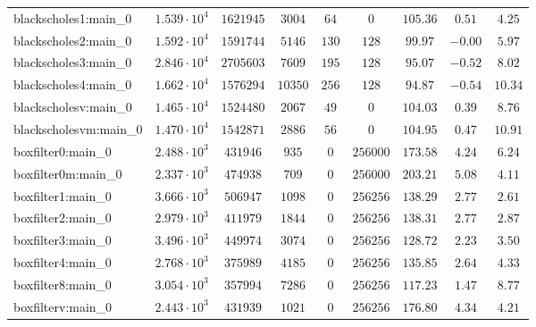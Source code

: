 \begin{tabular}{|l|c|c|c|c|c|c|c|c|}
blackscholes1:main\_0          & $ 1.539 \cdot 10^{4} $ & $ 1621945  $ & $ 3004   $ & $ 64   $ & $ 0        $ & $ 105.36      $ & $ 0.51    $ & $ 4.25    $ \\
blackscholes2:main\_0          & $ 1.592 \cdot 10^{4} $ & $ 1591744  $ & $ 5146   $ & $ 130  $ & $ 128      $ & $ 99.97       $ & $ -0.00   $ & $ 5.97    $ \\
blackscholes3:main\_0          & $ 2.846 \cdot 10^{4} $ & $ 2705603  $ & $ 7609   $ & $ 195  $ & $ 128      $ & $ 95.07       $ & $ -0.52   $ & $ 8.02    $ \\
blackscholes4:main\_0          & $ 1.662 \cdot 10^{4} $ & $ 1576294  $ & $ 10350  $ & $ 256  $ & $ 128      $ & $ 94.87       $ & $ -0.54   $ & $ 10.34   $ \\
blackscholesv:main\_0          & $ 1.465 \cdot 10^{4} $ & $ 1524480  $ & $ 2067   $ & $ 49   $ & $ 0        $ & $ 104.03      $ & $ 0.39    $ & $ 8.76    $ \\
blackscholesvm:main\_0         & $ 1.470 \cdot 10^{4} $ & $ 1542871  $ & $ 2886   $ & $ 56   $ & $ 0        $ & $ 104.95      $ & $ 0.47    $ & $ 10.91   $ \\
boxfilter0:main\_0             & $ 2.488 \cdot 10^{3} $ & $ 431946   $ & $ 935    $ & $ 0    $ & $ 256000   $ & $ 173.58      $ & $ 4.24    $ & $ 6.24    $ \\
boxfilter0m:main\_0            & $ 2.337 \cdot 10^{3} $ & $ 474938   $ & $ 709    $ & $ 0    $ & $ 256000   $ & $ 203.21      $ & $ 5.08    $ & $ 4.11    $ \\
boxfilter1:main\_0             & $ 3.666 \cdot 10^{3} $ & $ 506947   $ & $ 1098   $ & $ 0    $ & $ 256256   $ & $ 138.29      $ & $ 2.77    $ & $ 2.61    $ \\
boxfilter2:main\_0             & $ 2.979 \cdot 10^{3} $ & $ 411979   $ & $ 1844   $ & $ 0    $ & $ 256256   $ & $ 138.31      $ & $ 2.77    $ & $ 2.87    $ \\
boxfilter3:main\_0             & $ 3.496 \cdot 10^{3} $ & $ 449974   $ & $ 3074   $ & $ 0    $ & $ 256256   $ & $ 128.72      $ & $ 2.23    $ & $ 3.50    $ \\
boxfilter4:main\_0             & $ 2.768 \cdot 10^{3} $ & $ 375989   $ & $ 4185   $ & $ 0    $ & $ 256256   $ & $ 135.85      $ & $ 2.64    $ & $ 4.33    $ \\
boxfilter8:main\_0             & $ 3.054 \cdot 10^{3} $ & $ 357994   $ & $ 7286   $ & $ 0    $ & $ 256256   $ & $ 117.23      $ & $ 1.47    $ & $ 8.77    $ \\
boxfilterv:main\_0             & $ 2.443 \cdot 10^{3} $ & $ 431939   $ & $ 1021   $ & $ 0    $ & $ 256256   $ & $ 176.80      $ & $ 4.34    $ & $ 4.21    $ \\

\end{tabular}
